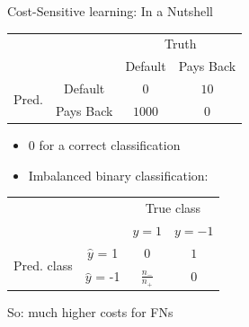 \documentclass[11pt,compress,t,notes=noshow, aspectratio=169, xcolor=table]{beamer}
\begin{document}
\begin{frame}{Cost-Sensitive learning: In a Nutshell}
{        \begin{minipage}{0.49\textwidth}
            \begin{table}[]
                \centering
                \begin{tabular}{p{1cm}c|cc}
                    & &\multicolumn{2}{c}{Truth} \\
                    & & Default & Pays Back  \\
                    \hline
                    \multirow{2}{*}{\parbox{1cm}{Pred.}} & Default & 0 & $ 10 $\\
                    & Pays Back & $1000$ & $0$   \\
                \end{tabular}
            \end{table}
        \end{minipage}
        \hfill
        \begin{minipage}{0.49\textwidth}
            \begin{itemize}
                \scriptsize
			
				\item 0 for a correct classification 
                    \vspace{1cm}
    		      \item Imbalanced binary classification: \\
            \end{itemize}
            \begin{table}[]
                \centering
                \begin{tabular}{cc|cc}
                    & &\multicolumn{2}{c}{True class} \\
                    & & $y=1$ & $y=-1$  \\
                    \hline
                    \multirow{2}{*}{\parbox{0.5cm}{Pred. class}}& $\hat y$ = 1     & $0$                & $ 1 $\\
                    & $\hat y$ = -1 & $ \frac{n_-}{n_+} $              &  $0$   \\
                \end{tabular}
            \end{table}
        \end{minipage}
    		

        So: much higher costs for FNs
    }
		
\end{frame}
\end{document}
